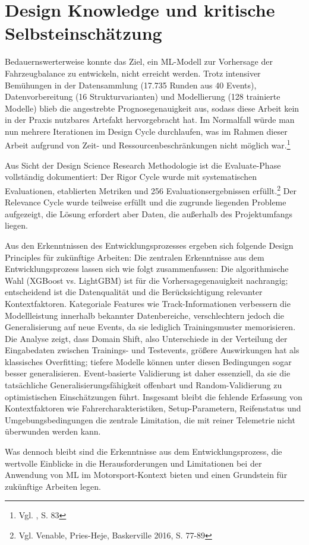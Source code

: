 \section{Design Knowledge und kritische Selbsteinschätzung}

Bedauernswerterweise konnte das Ziel, ein \ac{ML}-Modell zur Vorhersage der Fahrzeugbalance zu entwickeln, nicht erreicht werden. Trotz intensiver Bemühungen in der Datensammlung (17.735 Runden aus 40 Events), Datenvorbereitung (16 Strukturvarianten) und Modellierung (128 trainierte Modelle) blieb die angestrebte Prognosegenauigkeit aus, sodass diese Arbeit kein in der Praxis nutzbares Artefakt hervorgebracht hat. Im Normalfall würde man nun mehrere Iterationen im Design Cycle durchlaufen, was im Rahmen dieser Arbeit aufgrund von Zeit- und Ressourcenbeschränkungen nicht möglich war.\footnote{Vgl. \cite{Hevner2004}, S. 83}

Aus Sicht der Design Science Research Methodologie ist die Evaluate-Phase vollständig dokumentiert: Der Rigor Cycle wurde mit systematischen Evaluationen, etablierten Metriken und 256 Evaluationsergebnissen erfüllt.\footnote{Vgl. Venable, Pries-Heje, Baskerville 2016, S. 77-89} Der Relevance Cycle wurde teilweise erfüllt und die zugrunde liegenden Probleme aufgezeigt, die Lösung erfordert aber Daten, die außerhalb des Projektumfangs liegen.

Aus den Erkenntnissen des Entwicklungsprozesses ergeben sich folgende Design Principles für zukünftige Arbeiten:
Die zentralen Erkenntnisse aus dem Entwicklungsprozess lassen sich wie folgt zusammenfassen: Die algorithmische Wahl (XGBoost vs. LightGBM) ist für die Vorhersagegenauigkeit nachrangig; entscheidend ist die Datenqualität und die Berücksichtigung relevanter Kontextfaktoren. Kategoriale Features wie Track-Informationen verbessern die Modellleistung innerhalb bekannter Datenbereiche, verschlechtern jedoch die Generalisierung auf neue Events, da sie lediglich Trainingsmuster memorisieren. Die Analyse zeigt, dass Domain Shift, also Unterschiede in der Verteilung der Eingabedaten zwischen Trainings- und Testevents, größere Auswirkungen hat als klassisches Overfitting; tiefere Modelle können unter diesen Bedingungen sogar besser generalisieren. Event-basierte Validierung ist daher essenziell, da sie die tatsächliche Generalisierungsfähigkeit offenbart und Random-Validierung zu optimistischen Einschätzungen führt. Insgesamt bleibt die fehlende Erfassung von Kontextfaktoren wie Fahrercharakteristiken, Setup-Parametern, Reifenstatus und Umgebungsbedingungen die zentrale Limitation, die mit reiner Telemetrie nicht überwunden werden kann.

Was dennoch bleibt sind die Erkenntnisse aus dem Entwicklungsprozess, die wertvolle Einblicke in die Herausforderungen und Limitationen bei der Anwendung von \ac{ML} im Motorsport-Kontext bieten und einen Grundstein für zukünftige Arbeiten legen.
